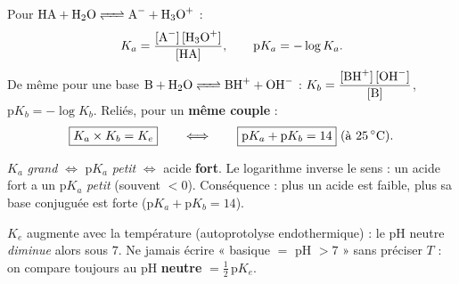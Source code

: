 \documentclass[11pt,a4paper]{article}
\begin{document}
\begin{cle}
Pour $\ce{HA + H2O <=> A- + H3O+}$ :
\[ K_a = \frac{[\ce{A-}]\,[\ce{H3O+}]}{[\ce{HA}]},\qquad \mathrm{p}K_a = -\log K_a. \]
De même pour une base $\ce{B + H2O <=> BH+ + OH-}$ : $K_b = \dfrac{[\ce{BH+}]\,[\ce{OH-}]}{[\ce{B}]}$,
$\mathrm{p}K_b = -\log K_b$. Reliés, pour un \textbf{même couple} :
\[ \boxed{K_a\times K_b = K_e}\qquad\Longleftrightarrow\qquad \boxed{\mathrm{p}K_a + \mathrm{p}K_b = 14}\ (\text{à \qty{25}{\celsius}}). \]
\end{cle}

\begin{piege}
$K_a$ \emph{grand} $\Leftrightarrow$ $\mathrm{p}K_a$ \emph{petit} $\Leftrightarrow$ acide \textbf{fort}. Le
logarithme inverse le sens : un acide fort a un $\mathrm{p}K_a$ \emph{petit} (souvent $<0$). Conséquence : plus
un acide est faible, plus sa base conjuguée est forte ($\mathrm{p}K_a + \mathrm{p}K_b = 14$).
\end{piege}

\begin{piege}
$K_e$ augmente avec la température (autoprotolyse endothermique) : le pH neutre \emph{diminue} alors sous $7$.
Ne jamais écrire « basique $=$ pH $>7$ » sans préciser $T$ : on compare toujours au pH \textbf{neutre}
$= \tfrac12\,\mathrm{p}K_e$.
\end{piege}
\end{document}
